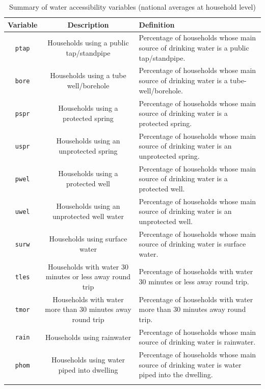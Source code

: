 \documentclass[10pt,twoside]{article}
\numberwithin{equation}{section}
\newcommand{\?}{\stackrel{?}{=}}
\begin{document}
\begin{table}[h!]
  \centering
  \begin{tabular}{c c m{7cm}}\toprule
    \bf Variable & \bf Description & \bf Definition \\\midrule
    \texttt{ptap} & Households using a public tap/standpipe
 & Percentage of households whose main source of drinking water is a public tap/standpipe.
 \\\hline
 \texttt{bore} & Households using a tube well/borehole & Percentage of households whose main source of drinking water is a tube-well/borehole.
\\\hline
\texttt{pspr} & Households using a protected spring
& Percentage of households whose main source of drinking water is a protected spring.
\\\hline
\texttt{uspr} & Households using an unprotected spring
& Percentage of households whose main source of drinking water is an unprotected spring.
\\\hline
\texttt{pwel} & Households using a protected well
& Percentage of households whose main source of drinking water is a protected well.
\\\hline
\texttt{uwel} & Households using an unprotected well water
&Percentage of households whose main source of drinking water is an unprotected well.
\\\hline
\texttt{surw} & Households using surface water
& Percentage of households whose main source of drinking water is surface water.
\\\hline
\texttt{tles} & Households with water 30 minutes or less away round trip
&Percentage of households with water 30 minutes or less away round trip.
\\\hline 
\texttt{tmor} & Households with water more than 30 minutes away round trip & Percentage of households with water more than 30 minutes away round trip.
\\\hline
\texttt{rain} & Households using rainwater
& Percentage of households whose main source of drinking water is rainwater.
\\\hline
\texttt{phom} & Households using water piped into dwelling
&Percentage of households whose main source of drinking water is water piped into the dwelling.
\\\hline

& \\\bottomrule
  \end{tabular}
  \caption{Summary of water accessibility variables (national averages at household level)}
  \label{tab:summary}
\end{table}
\end{document}

